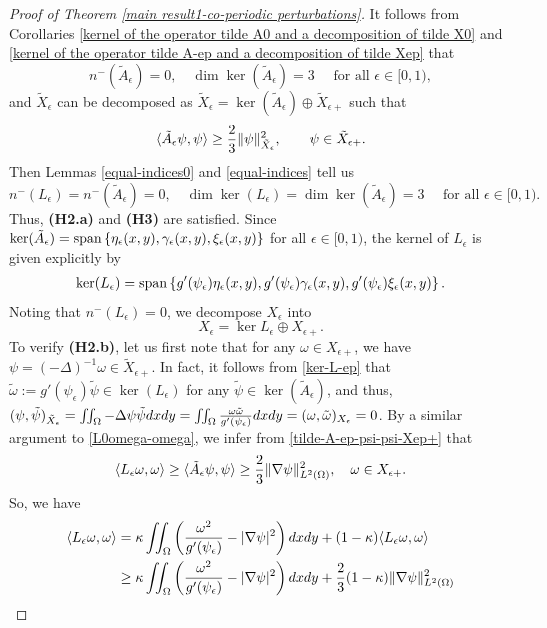 \documentclass[1 [leqno, 11pt]{amsart}
\numberwithin{equation}{section}
\let\ep=\epsilon
\begin{document}
\begin{CJK*}{GBK}{song}
\begin{proof}[Proof of Theorem \ref{main result1-co-periodic perturbations}]
It follows from Corollaries  \ref{kernel of  the operator tilde A0 and a decomposition of tilde X0} and  \ref{kernel of  the operator tilde A-ep and a decomposition of tilde Xep} that
$$n^-(\tilde{A}_\ep) = 0, \quad \dim \ker (\tilde{A}_\ep) = 3 \quad\text{ for all } \epsilon \in [0,1),$$
and $\tilde X_\ep$ can be decomposed as  $\tilde X_\ep=\ker (\tilde A_\ep) \oplus\tilde X_{\ep+}$ such that
\begin{align}\label{tilde-A-ep-psi-psi-Xep+}
\langle \tilde A_\ep \psi,\psi\rangle \geq {2\over3} \| \psi\|_{\tilde X_\ep}^2, \quad \quad \psi\in \tilde X_{\ep+}.
\end{align}
Then Lemmas \ref{equal-indices0} and \ref{equal-indices} tell us
$$n^-(L_\ep) = n^-(\tilde{A}_\ep) = 0, \quad \dim \ker (L_\ep) = \dim \ker (\tilde{A}_\ep) = 3 \quad\text{ for all } \epsilon \in [0,1).$$
Thus,  \textbf{(H2.a)} and \textbf{(H3)} are satisfied.
Since $\ker (\tilde{A}_\ep)={\rm{span}}\left\{\eta_\ep(x,y), \gamma_\ep(x,y), \xi_\ep(x,y)\right\}$  for all  $\epsilon \in [0,1)$, the kernel of $L_\ep$ is given explicitly by
\begin{align}\label{ker-L-ep}
\ker (L_\ep)={\rm{span}}\left\{g'(\psi_\ep)\eta_\ep(x,y), g'(\psi_\ep)\gamma_\ep(x,y), g'(\psi_\ep)\xi_\ep(x,y)\right\}.
\end{align}
Noting that $n^-(L_\ep)=0$, we  decompose $X_\ep$ into
$$X_\ep = \ker L_\ep \oplus X_{\ep+}.$$
  To verify \textbf{(H2.b)}, let us first note that for any $\omega \in X_{\ep+}$, we have $\psi=(-\Delta)^{-1}\omega\in \tilde X_{\ep+}$. In fact, it follows from \eqref{ker-L-ep} that $\tilde \omega:=g'(\psi_\ep)\tilde \psi\in\ker (L_\ep)$ for any $\tilde\psi\in \ker(\tilde A_\ep)$, and thus,   $(\psi,\tilde \psi)_{\tilde X_\ep}=\iint_{\Omega}-\Delta\psi\tilde \psi dxdy=\iint_{\Omega}{\omega\tilde \omega\over g'(\psi_\ep)} dxdy=(\omega,\tilde \omega)_{X_\ep}=0$.
By a similar argument to
\eqref{L0omega-omega}, we infer from \eqref{tilde-A-ep-psi-psi-Xep+} that
$$\langle L_\ep \omega, \omega \rangle \geq \langle \tilde{A}_\ep \psi, \psi \rangle\geq {2\over3} \|\nabla \psi\|_{L^2(\Omega)}^2, \quad \omega\in X_{\ep+}.$$
So, we have
\begin{align}\nonumber
\langle L_\ep \omega, \omega \rangle & = \kappa \iint_\Omega\left( \frac{\omega^2}{g'(\psi_\ep)} - |\nabla \psi|^2 \right)dxdy + (1-\kappa)\langle L_\ep \omega, \omega \rangle \\\nonumber
& \geq \kappa \iint_\Omega\left( \frac{\omega^2}{g'(\psi_\ep)} - |\nabla \psi|^2 \right)dxdy + {2\over3}(1-\kappa)  \|\nabla \psi\|_{L^2(\Omega)}^2\\\label{positive-decom}

\end{align}
\end{proof}
\end{CJK*}
\end{document}
